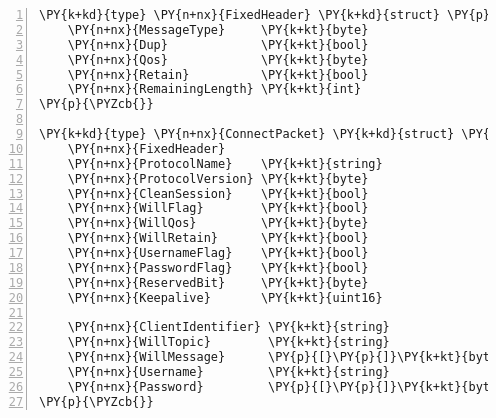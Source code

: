\begin{Verbatim}[commandchars=\\\{\},numbers=left,firstnumber=1,stepnumber=1,frame=single]
\PY{k+kd}{type} \PY{n+nx}{FixedHeader} \PY{k+kd}{struct} \PY{p}{\PYZob{}}
	\PY{n+nx}{MessageType}     \PY{k+kt}{byte}
	\PY{n+nx}{Dup}             \PY{k+kt}{bool}
	\PY{n+nx}{Qos}             \PY{k+kt}{byte}
	\PY{n+nx}{Retain}          \PY{k+kt}{bool}
	\PY{n+nx}{RemainingLength} \PY{k+kt}{int}
\PY{p}{\PYZcb{}}

\PY{k+kd}{type} \PY{n+nx}{ConnectPacket} \PY{k+kd}{struct} \PY{p}{\PYZob{}}
	\PY{n+nx}{FixedHeader}
	\PY{n+nx}{ProtocolName}    \PY{k+kt}{string}
	\PY{n+nx}{ProtocolVersion} \PY{k+kt}{byte}
	\PY{n+nx}{CleanSession}    \PY{k+kt}{bool}
	\PY{n+nx}{WillFlag}        \PY{k+kt}{bool}
	\PY{n+nx}{WillQos}         \PY{k+kt}{byte}
	\PY{n+nx}{WillRetain}      \PY{k+kt}{bool}
	\PY{n+nx}{UsernameFlag}    \PY{k+kt}{bool}
	\PY{n+nx}{PasswordFlag}    \PY{k+kt}{bool}
	\PY{n+nx}{ReservedBit}     \PY{k+kt}{byte}
	\PY{n+nx}{Keepalive}       \PY{k+kt}{uint16}

	\PY{n+nx}{ClientIdentifier} \PY{k+kt}{string}
	\PY{n+nx}{WillTopic}        \PY{k+kt}{string}
	\PY{n+nx}{WillMessage}      \PY{p}{[}\PY{p}{]}\PY{k+kt}{byte}
	\PY{n+nx}{Username}         \PY{k+kt}{string}
	\PY{n+nx}{Password}         \PY{p}{[}\PY{p}{]}\PY{k+kt}{byte}
\PY{p}{\PYZcb{}}
\end{Verbatim}
